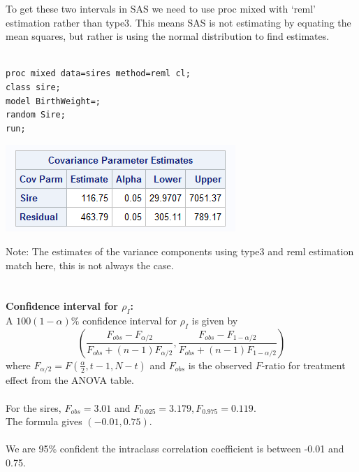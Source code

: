 \newpage
To get these two intervals in SAS we need to use proc mixed with `reml' estimation rather than type3.  This means SAS is not estimating by equating the mean squares, but rather is using the normal distribution to find estimates.\\~\\
\begin{small}
\begin{verbatim}
proc mixed data=sires method=reml cl;
class sire; 
model BirthWeight=; 
random Sire; 
run;
\end{verbatim}
\end{small}

\begin{center}
\includegraphics[scale=0.9]{Sire4}
\end{center}

Note:  The estimates of the variance components using type3 and reml estimation match here, this is not always the case.\\~\\~\\
\textbf{Confidence interval for $\rho_I$:}\\
A $100(1-\alpha)\%$ confidence interval for $\rho_I$ is given by
$$\left(\frac{F_{obs}-F_{\alpha/2}}{F_{obs}+(n-1)F_{\alpha/2}},\frac{F_{obs}-F_{1-\alpha/2}}{F_{obs}+(n-1)F_{1-\alpha/2}}\right) $$
where $F_{\alpha/2}=F(\frac{\alpha}{2},t-1,N-t)$ and $F_{obs}$ is the observed $F$-ratio for treatment effect from the ANOVA table.\\~\\
For the sires, $F_{obs}=3.01$ and $F_{0.025}=3.179, F_{0.975} = 0.119$.\\
The formula gives $(-0.01,0.75)$.  \\~\\
We are 95\% confident the intraclass correlation coefficient is between -0.01 and 0.75.

